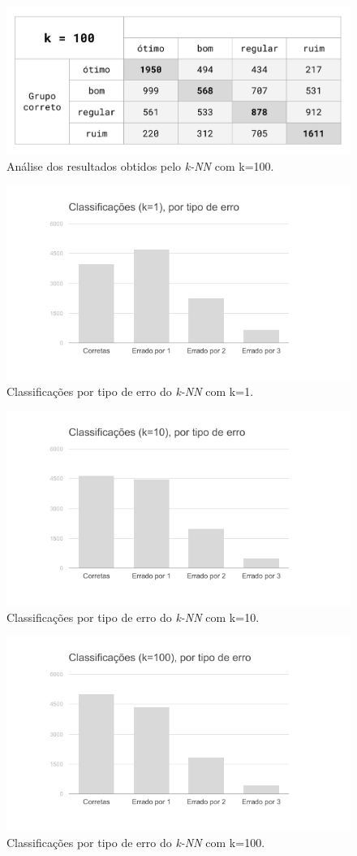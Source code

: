 \documentclass[12pt]{article}
\begin{document}
\begin{figure}[H]
\centering\includegraphics[width=.60\linewidth]{plot-white100.png}
\caption{Análise dos resultados obtidos pelo \emph{k-NN} com k=100.}
\label{fig:tab100}
\end{figure}

\begin{figure}[H]
\centering\includegraphics[width=.65\linewidth]{graf-white1.png}
\caption{Classificações por tipo de erro do \emph{k-NN} com k=1.}
\label{fig:graf1}
\end{figure}

\begin{figure}[H]
\centering\includegraphics[width=.65\linewidth]{graf-white10.png}
\caption{Classificações por tipo de erro do \emph{k-NN} com k=10.}
\label{fig:graf10}
\end{figure}

\begin{figure}[H]
\centering\includegraphics[width=.65\linewidth]{graf-white100.png}
\caption{Classificações por tipo de erro do \emph{k-NN} com k=100.}
\label{fig:graf100}
\end{figure}
\end{document}
